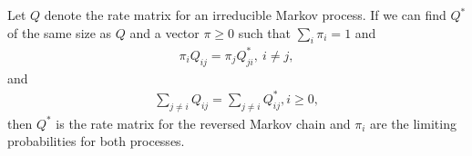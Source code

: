 \documentclass[a4paper,10pt,english]{article}
\begin{document}
\begin{thm}
Let $Q$ denote the rate matrix for an irreducible Markov process. If we can find $Q^*$ of the same size as $Q$ and a vector $\pi \geq 0$ such that $\sum_i \pi_i =1$ and 
\begin{align*}
\pi_{i}Q_{ij} =\pi_jQ_{ji}^*, ~ i \neq j,
\end{align*} and
\begin{align*}
\sum_{j \neq i}Q_{ij}=\sum_{j \neq i}Q_{ij}^*, i \geq 0,
\end{align*} 
then $Q^*$ is the rate matrix for the reversed Markov chain and $\pi_i$ are the limiting probabilities for both  processes.
\end{thm}
\end{document}
